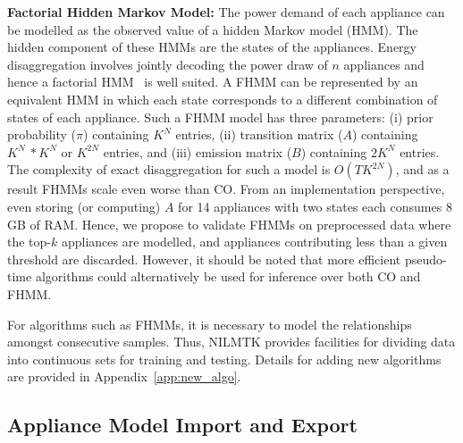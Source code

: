 \documentclass{sig-alternate}
\newcommand{\redcolor}[1]{\textcolor{red}{#1}}
\newcommand{\appref}[1]{Appendix~\ref{#1}}
\begin{document}
\textbf{Factorial Hidden Markov Model:} The power demand of each appliance can be modelled as the observed value of a hidden Markov model (HMM). The hidden component of these HMMs are the states of the appliances. Energy disaggregation involves jointly decoding the power draw of $n$ appliances and hence a factorial HMM~\cite{fhmm} is well suited. A FHMM can be represented by an equivalent HMM in which each state corresponds to a different combination of states of each appliance. Such a FHMM model has three parameters: (i) prior probability ($\pi$) containing $K^N$ entries, (ii) transition matrix ($A$) containing $K^N~*K^N$ or $K^{2N}$ entries, and (iii) emission matrix ($B$) containing $2K^N$ entries. The complexity of exact disaggregation for such a model is $O(TK^{2N})$, and as a result FHMMs scale even worse than CO. From an implementation perspective, even storing (or computing) $A$ for 14 appliances with two states each consumes 8 GB of RAM. Hence, we propose to validate FHMMs on preprocessed data where the top-$k$ appliances are modelled, and appliances contributing less than a given threshold are discarded. However, it should be noted that more efficient pseudo-time algorithms could alternatively be used for inference over both CO and FHMM.

For algorithms such as FHMMs, it is necessary to model the relationships amongst consecutive samples. Thus, NILMTK provides facilities for dividing data into continuous sets for training and testing. Details for adding new algorithms are provided in \appref{app:new_algo}.

\subsection{Appliance Model Import and Export}

\end{document}
